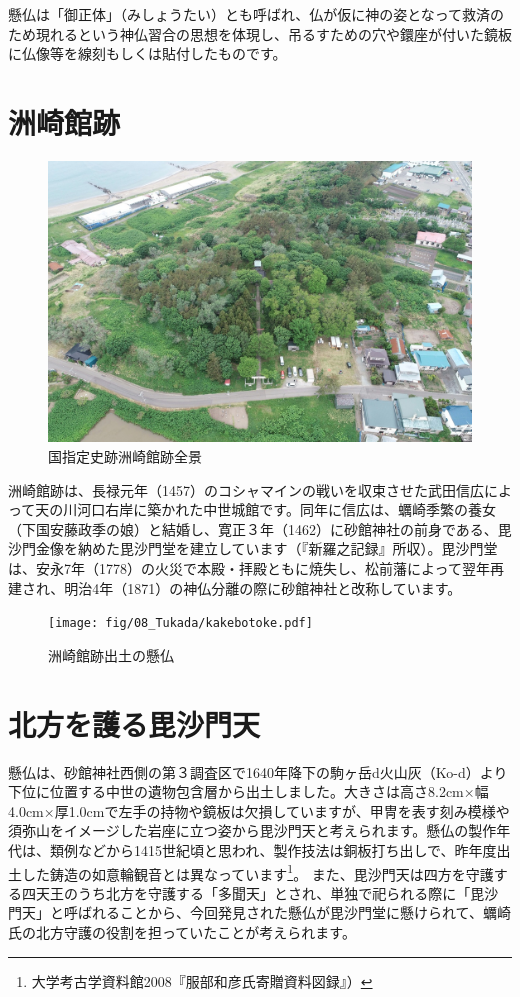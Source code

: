 \documentclass[a4j,11pt,twocolumn,openany]{jsbook}
\begin{document}
懸仏は「御正体」（みしょうたい）とも呼ばれ、仏が仮に神の姿となって救済のため現れるという神仏習合の思想を体現し、吊るすための穴や鐶座が付いた鏡板に仏像等を線刻もしくは貼付したものです。

\section{洲崎館跡}

\begin{figure}[ht]
	\centering
	\includegraphics[width=\linewidth]{fig/08_Tukada/01enkei.JPG}
	\caption{国指定史跡洲崎館跡全景}
	\label{}
	\vspace{-\baselineskip}
\end{figure}

洲崎館跡は、長禄元年（1457）のコシャマインの戦いを収束させた武田信広によって天の川河口右岸に築かれた中世城館です。同年に信広は、蠣崎季繁の養女（下国安藤政季の娘）と結婚し、寛正３年（1462）に砂館神社の前身である、毘沙門金像を納めた毘沙門堂を建立しています（『新羅之記録』所収）。毘沙門堂は、安永7年（1778）の火災で本殿・拝殿ともに焼失し、松前藩によって翌年再建され、明治4年（1871）の神仏分離の際に砂館神社と改称しています。

\begin{figure}[ht]
	\centering
	\texttt{[image: fig/08\_Tukada/kakebotoke.pdf]}
	\caption{洲崎館跡出土の懸仏}
	\label{}
\end{figure}


\section{北方を護る毘沙門天}
懸仏は、砂館神社西側の第３調査区で1640年降下の駒ヶ岳d火山灰（Ko-d）より下位に位置する中世の遺物包含層から出土しました。大きさは高さ8.2cm×幅4.0cm×厚1.0cmで左手の持物や鏡板は欠損していますが、甲冑を表す刻み模様や須弥山をイメージした岩座に立つ姿から毘沙門天と考えられます。懸仏の製作年代は、類例などから1415世紀頃と思われ、製作技法は銅板打ち出しで、昨年度出土した鋳造の如意輪観音とは異なっています\footnote{
	大学考古学資料館2008『服部和彦氏寄贈資料図録』）
}。
また、毘沙門天は四方を守護する四天王のうち北方を守護する「多聞天」とされ、単独で祀られる際に「毘沙門天」と呼ばれることから、今回発見された懸仏が毘沙門堂に懸けられて、蠣崎氏の北方守護の役割を担っていたことが考えられます。
\end{document}
